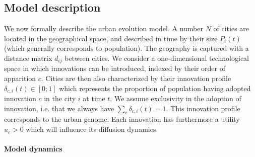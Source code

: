 \documentclass[letterpaper]{article}
\begin{document}
\subsection{Model description}


 
We now formally describe the urban evolution model. A number $N$ of cities are located in the geographical space, and described in time by their size $P_i (t)$ (which generally corresponds to population). The geography is captured with a distance matrix $d_{ij}$ between cities. We consider a one-dimensional technological space in which innovations can be introduced, indexed by their order of apparition $c$. Cities are then also characterized by their innovation profile $\delta_{c,i} (t) \in \left[0;1\right]$ which represents the proportion of population having adopted innovation $c$ in the city $i$ at time $t$. We assume exclusivity in the adoption of innovation, i.e. that we always have $\sum_c \delta_{c,i} (t) = 1$. This innovation profile corresponds to the urban genome. Each innovation has furthermore a utility $u_c >0$ which will influence its diffusion dynamics.


\paragraph{Model dynamics}

\end{document}
